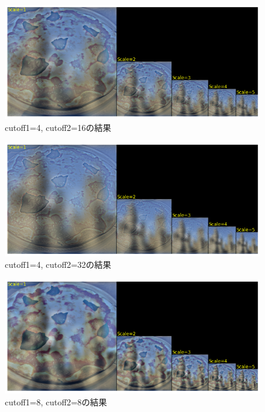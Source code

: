 \documentclass[12pt]{jarticle}
\begin{document}
\begin{figure}[h]
    \begin{center}
        \includegraphics[scale=0.7]{kadai4_3_6.png}
    \end{center}
    \caption{cutoff1=4, cutoff2=16の結果}
\end{figure}

\clearpage
\begin{figure}[h]
    \begin{center}
        \includegraphics[scale=0.7]{kadai4_3_7.png}
    \end{center}
    \caption{cutoff1=4, cutoff2=32の結果}
\end{figure}

\begin{figure}[h]
    \begin{center}
        \includegraphics[scale=0.7]{kadai4_3_8.png}
    \end{center}
    \caption{cutoff1=8, cutoff2=8の結果}
\end{figure}
\end{document}
